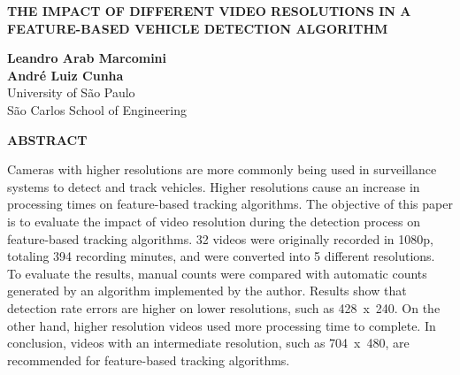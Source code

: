 \documentclass[article,12pt,a4paper,oneside,hidelinks]{memoir}
\newenvironment{tightcenter}{%
	\setlength\topsep{0pt}
	\setlength\parskip{0pt}
	\begin{center}
	}{%
	\end{center}
}
\begin{document}
\begin{tightcenter}
	\uppercase{\textbf{The Impact of Different Video Resolutions in a Feature-based Vehicle Detection Algorithm}} \par
	\vspace{12pt}
	\textbf{%
		Leandro Arab Marcomini
		\\
		André Luiz Cunha
	}\\
	\footnotesize{
		University of São Paulo
		\\
		São Carlos School of Engineering
	}

\end{tightcenter}

\begin{footnotesize}
	\uppercase{\footnotesize{\textbf{abstract}}}
	\setlength{\parskip}{0pt} \par
	\begin{SingleSpace}
		\footnotesize
		Cameras with higher resolutions are more commonly being used in surveillance systems to detect and track vehicles. Higher resolutions cause an increase in processing times on feature-based tracking algorithms. The objective of this paper is to evaluate the impact of video resolution during the detection process on feature-based tracking algorithms. 32 videos were originally recorded in 1080p, totaling 394 recording minutes, and were converted into 5 different resolutions. To evaluate the results, manual counts were compared with automatic counts generated by an algorithm implemented by the author. Results show that detection rate errors are higher on lower resolutions, such as 428~x~240. On the other hand, higher resolution videos used more processing time to complete. In conclusion, videos with an intermediate resolution, such as 704~x~480, are recommended for feature-based tracking algorithms.
		\setlength{\parskip}{12pt}
	\end{SingleSpace}
\end{footnotesize}
\end{document}
